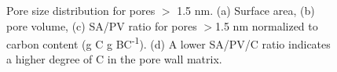 \begin{figure}[!ht]
\hfill
{}
\medskip
{}
\hfill
{}
\caption{Pore size distribution for pores $>$ 1.5 nm. (a) Surface area, (b) pore volume, (c) SA/PV ratio for pores $>$1.5 nm normalized to carbon content (g C g BC\textsuperscript{-1}). (d) A lower SA/PV/C ratio indicates a higher degree of C in the pore wall matrix.}
\label{fig:PZD}
\end{figure}

